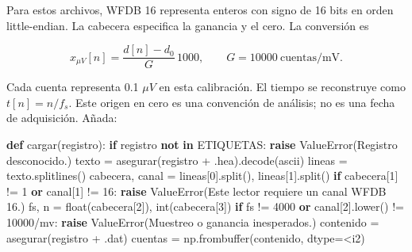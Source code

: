 \documentclass[
  spanish,
  10.5pt,
  a4paper,
  DIV=11,
  numbers=noendperiod]{scrartcl}
\newenvironment{Shaded}{\begin{snugshade}}{\end{snugshade}}
\newcommand{\BuiltInTok}[1]{\textcolor[rgb]{0.00,0.23,0.31}{#1}}
\newcommand{\ControlFlowTok}[1]{\textcolor[rgb]{0.00,0.23,0.31}{\textbf{#1}}}
\newcommand{\DecValTok}[1]{\textcolor[rgb]{0.68,0.00,0.00}{#1}}
\newcommand{\KeywordTok}[1]{\textcolor[rgb]{0.00,0.23,0.31}{\textbf{#1}}}
\newcommand{\NormalTok}[1]{\textcolor[rgb]{0.00,0.23,0.31}{#1}}
\newcommand{\OperatorTok}[1]{\textcolor[rgb]{0.37,0.37,0.37}{#1}}
\newcommand{\PreprocessorTok}[1]{\textcolor[rgb]{0.68,0.00,0.00}{#1}}
\newcommand{\StringTok}[1]{\textcolor[rgb]{0.13,0.47,0.30}{#1}}
\begin{document}
Para estos archivos, WFDB 16 representa enteros con signo de 16 bits en
orden little-endian. La cabecera especifica la ganancia y el cero. La
conversión es

\[x_{\mu V}[n]=\frac{d[n]-d_0}{G}\,1000,
\qquad G=10000\ \text{cuentas/mV}.\]

Cada cuenta representa 0.1 \(\mu V\) en esta calibración. El tiempo se
reconstruye como \(t[n]=n/f_s\). Este origen en cero es una convención
de análisis; no es una fecha de adquisición. Añada:

\begin{Shaded}
\begin{Highlighting}[]
\KeywordTok{def}\NormalTok{ cargar(registro):}
    \ControlFlowTok{if}\NormalTok{ registro }\KeywordTok{not} \KeywordTok{in}\NormalTok{ ETIQUETAS:}
        \ControlFlowTok{raise} \PreprocessorTok{ValueError}\NormalTok{(}\StringTok{\textquotesingle{}Registro desconocido.\textquotesingle{}}\NormalTok{)}
\NormalTok{    texto }\OperatorTok{=}\NormalTok{ asegurar(registro }\OperatorTok{+} \StringTok{\textquotesingle{}.hea\textquotesingle{}}\NormalTok{).decode(}\StringTok{\textquotesingle{}ascii\textquotesingle{}}\NormalTok{)}
\NormalTok{    lineas }\OperatorTok{=}\NormalTok{ texto.splitlines()}
\NormalTok{    cabecera, canal }\OperatorTok{=}\NormalTok{ lineas[}\DecValTok{0}\NormalTok{].split(), lineas[}\DecValTok{1}\NormalTok{].split()}
    \ControlFlowTok{if}\NormalTok{ cabecera[}\DecValTok{1}\NormalTok{] }\OperatorTok{!=} \StringTok{\textquotesingle{}1\textquotesingle{}} \KeywordTok{or}\NormalTok{ canal[}\DecValTok{1}\NormalTok{] }\OperatorTok{!=} \StringTok{\textquotesingle{}16\textquotesingle{}}\NormalTok{:}
        \ControlFlowTok{raise} \PreprocessorTok{ValueError}\NormalTok{(}\StringTok{\textquotesingle{}Este lector requiere un canal WFDB 16.\textquotesingle{}}\NormalTok{)}
\NormalTok{    fs, n }\OperatorTok{=} \BuiltInTok{float}\NormalTok{(cabecera[}\DecValTok{2}\NormalTok{]), }\BuiltInTok{int}\NormalTok{(cabecera[}\DecValTok{3}\NormalTok{])}
    \ControlFlowTok{if}\NormalTok{ fs }\OperatorTok{!=} \DecValTok{4000} \KeywordTok{or}\NormalTok{ canal[}\DecValTok{2}\NormalTok{].lower() }\OperatorTok{!=} \StringTok{\textquotesingle{}10000/mv\textquotesingle{}}\NormalTok{:}
        \ControlFlowTok{raise} \PreprocessorTok{ValueError}\NormalTok{(}\StringTok{\textquotesingle{}Muestreo o ganancia inesperados.\textquotesingle{}}\NormalTok{)}
\NormalTok{    contenido }\OperatorTok{=}\NormalTok{ asegurar(registro }\OperatorTok{+} \StringTok{\textquotesingle{}.dat\textquotesingle{}}\NormalTok{)}
\NormalTok{    cuentas }\OperatorTok{=}\NormalTok{ np.frombuffer(contenido, dtype}\OperatorTok{=}\StringTok{\textquotesingle{}\textless{}i2\textquotesingle{}}\NormalTok{)}

\end{Highlighting}
\end{Shaded}
\end{document}
